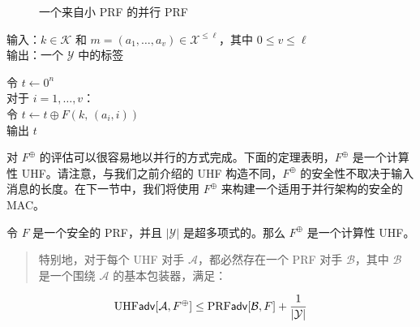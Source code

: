\begin{figure}
  \centering
  
  \caption{一个来自小 PRF 的并行 PRF}
  \label{fig:7-2}
\end{figure}

\vspace{5pt}

\hspace*{5pt} 输入：$k\in\mathcal{K}$ 和 $m=(a_1,\dots,a_v)\in\mathcal{X}^{\leq\ell}$，其中 $0\leq v\leq\ell$\\
\hspace*{26pt} 输出：一个 $\mathcal{Y}$ 中的标签

\vspace{5pt}

\hspace*{5pt} 令 $t\leftarrow0^n$\\
\hspace*{26pt} 对于 $i=1,\dots,v$：\\
\hspace*{50pt} 令 $t\leftarrow t\oplus F(k,\,(a_i,i))$\\
\hspace*{26pt} 输出 $t$

\vspace{5pt}

\noindent
对 $F^\oplus$ 的评估可以很容易地以并行的方式完成。下面的定理表明，$F^\oplus$ 是一个计算性 UHF。请注意，与我们之前介绍的 UHF 构造不同，$F^\oplus$ 的安全性不取决于输入消息的长度。在下一节中，我们将使用 $F^\oplus$ 来构建一个适用于并行架构的安全的 MAC。

\begin{theorem}\label{theo:7-6}
令 $F$ 是一个安全的 PRF，并且 $|\mathcal{Y}|$ 是超多项式的。那么 $F^\oplus$ 是一个计算性 UHF。
\begin{quote}
特别地，对于每个 UHF 对手 $\mathcal{A}$，都必然存在一个 PRF 对手 $\mathcal{B}$，其中 $\mathcal{B}$ 是一个围绕 $\mathcal{A}$ 的基本包装器，满足：
\end{quote}
\begin{equation}\label{eq:7-12}
{\rm UHF}\mathsf{adv}[\mathcal{A},F^\oplus]\leq{\rm PRF}\mathsf{adv}[\mathcal{B},F]+\frac{1}{|\mathcal{Y}|}
\end{equation}
\end{theorem}

